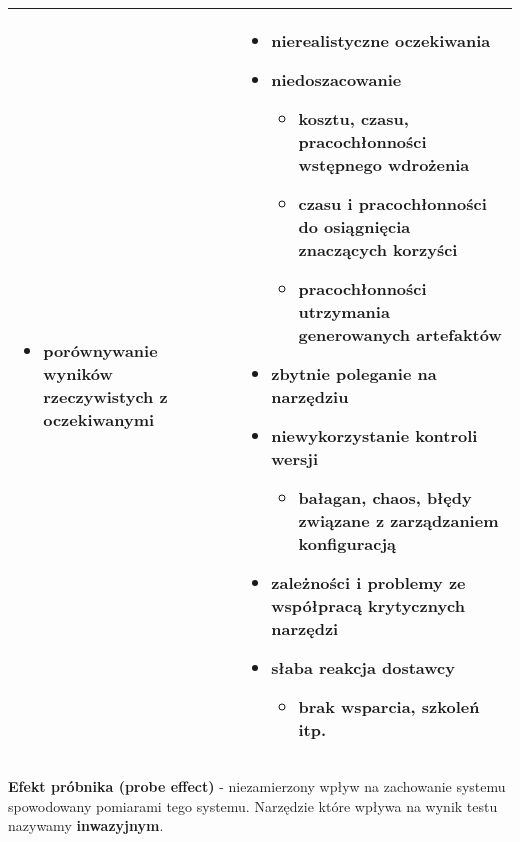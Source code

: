 \documentclass[../main.tex]{subfiles}
\begin{document}
\begin{table}[H]
\begin{center}
\begin{tabular}{| p{8cm} | p{8cm} |}
\begin{itemize}
\begin{itemize}
                    \end{itemize}
                    \item \textbf{porównywanie wyników} rzeczywistych z oczekiwanymi
                \end{itemize}
                &
                \begin{itemize}
                    \item \textbf{nierealistyczne oczekiwania}
                    \item \textbf{niedoszacowanie}
                    \begin{itemize}
                        \item kosztu, czasu, pracochłonności wstępnego wdrożenia
                        \item czasu i pracochłonności do osiągnięcia znaczących korzyści
                        \item pracochłonności utrzymania generowanych artefaktów
                    \end{itemize}
                    \item \textbf{zbytnie poleganie na narzędziu}
                    \item \textbf{niewykorzystanie kontroli wersji}
                    \begin{itemize}
                        \item bałagan, chaos, błędy związane z zarządzaniem konfiguracją
                    \end{itemize}
                    \item zależności i \textbf{problemy ze współpracą} krytycznych narzędzi
                    \item słaba reakcja dostawcy
                    \begin{itemize}
                        \item brak wsparcia, szkoleń itp.
                    \end{itemize}
                \end{itemize} \\
                \hline
            \end{tabular}
        \end{center}
    \end{table}


    \textbf{Efekt próbnika (probe effect)} - niezamierzony wpływ na zachowanie systemu spowodowany pomiarami tego systemu.
    Narzędzie które wpływa na wynik testu nazywamy \textbf{inwazyjnym}.
\end{document}
